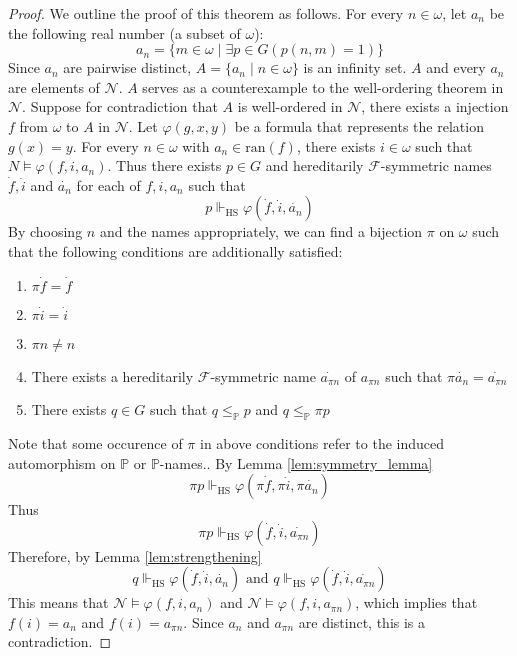 \documentclass{report}
\newcommand{\Pbb}{\mathbb{P}}
\newcommand{\Fcal}{\mathcal{F}}
\newcommand{\Ncal}{\mathcal{N}}
\begin{document}
\begin{proof}
We outline the proof of this theorem as follows. 
For every $n \in \omega$, let $a_n$ be the following real number (a subset of $\omega$):
$$a_n = \{ m \in \omega \mid \exists p \in G (p(n, m) = 1) \}$$
Since $a_n$ are pairwise distinct, $A = \{ a_n \mid n \in \omega \}$ is an infinity set.
$A$ and every $a_n$ are elements of $\Ncal$.
$A$ serves as a counterexample to the well-ordering theorem in $\Ncal$.
Suppose for contradiction that $A$ is well-ordered in $\Ncal$, there exists a injection $f$ from $\omega$ to $A$ in $\Ncal$.
Let $\varphi(g,x,y)$ be a formula that represents the relation $g(x) = y$. 
For every $n \in \omega$ with $a_n \in \text{ran}(f)$, there exists $i \in \omega$ such that $N \vDash \varphi(f, i, a_n)$.
Thus there exists $p \in G$ and hereditarily $\Fcal$-symmetric names $\dot{f}, \dot{i}$ and $\dot{a_n}$ for each of $f, i, a_n$ such that 
$$p \Vdash_{\text{HS}} \varphi(\dot{f}, \dot{i}, \dot{a_n})$$
By choosing $n$ and the names appropriately, we can find a bijection $\pi$ on $\omega$ such that the following conditions are additionally satisfied:
\begin{enumerate}
  \item $\pi \dot{f} = \dot{f}$
  \item $\pi \dot{i} = \dot{i}$
  \item $\pi n \ne n$
  \item There exists a hereditarily $\Fcal$-symmetric name $\dot{a_{\pi n}}$ of $a_{\pi n}$ such that $\pi \dot{a_n} = \dot{a_{\pi n}}$
  \item There exists $q \in G$ such that $q \leq_{\Pbb} p$ and $q \leq_{\Pbb} \pi p$
\end{enumerate}
Note that some occurence of $\pi$ in above conditions refer to the induced automorphism on $\Pbb$ or $\Pbb$-names..
By Lemma \ref{lem:symmetry_lemma}
$$\pi p \Vdash_{\text{HS}} \varphi(\pi \dot{f}, \pi \dot{i}, \pi \dot{a_n})$$
Thus 
$$\pi p \Vdash_{\text{HS}} \varphi(\dot{f}, \dot{i}, \dot{a_{\pi n}})$$
Therefore, by Lemma \ref{lem:strengthening}
$$q \Vdash_{\text{HS}} \varphi(\dot{f}, \dot{i}, \dot{a_n}) \text{ and } q \Vdash_{\text{HS}} \varphi(\dot{f}, \dot{i}, \dot{a_{\pi n}})$$
This means that $\Ncal \vDash \varphi(f, i, a_n)$ and $\Ncal \vDash \varphi(f, i, a_{\pi n})$, which implies that $f(i) = a_n$ and $f(i) = a_{\pi n}$.
Since $a_n$ and $a_{\pi n}$ are distinct, this is a contradiction. 
\end{proof}
 
\end{document}
